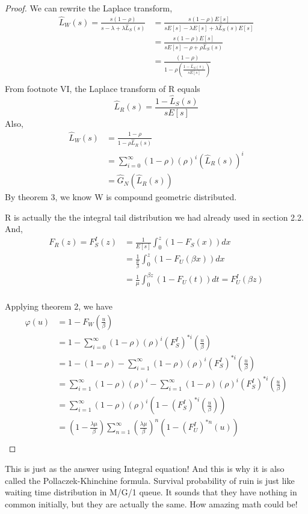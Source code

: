 \documentclass[project2.tex]{subfiles}
\begin{document}
\begin{proof}
We can rewrite the Laplace transform,
\begin{align*}
\hat{L}_W(s)=\frac{s(1-\rho)}{s-\lambda+\lambda\hat{L}_S(s)}&=\frac{s(1-\rho)E[s]}{sE[s]-\lambda E[s]+\lambda\hat{L}_S(s)E[s]}\\
&=\frac{s(1-\rho)E[s]}{sE[s]-\rho+\rho\hat{L}_S(s)}\\
&=\frac{(1-\rho)}{1-\rho(\frac{1-\hat{L}_S(s)}{sE[s]})}\\
\end{align*} 
From footnote VI, the Laplace transform of R equals $$\hat{L}_R(s)=\frac{1-\hat{L}_S(s)}{sE[s]}$$
Also,
\begin{align*}
\hat{L}_W(s)&=\frac{1-\rho}{1-\rho\hat{L}_R(s)}\\
&=\sum_{i=0}^{\infty}(1-\rho)(\rho)^i(\hat{L}_R(s))^i\\
&=\hat{G}_N(\hat{L}_R(s))
\end{align*} 
By theorem 3, we know W is compound geometric distributed.
\begin{remark}
R is actually the the integral tail distribution we had already used in section 2.2. And, 
\begin{align*}
F_R(z)=F_S^I(z)&=\frac{1}{E[s]}\int_0^z(1-F_S(x))dx\\
&=\frac{1}{\frac{\mu}{\beta}}\int_0^z(1-F_U(\beta x))dx\\
&=\frac{1}{\mu}\int_0^{\beta z}(1-F_U(t))dt=F_U^I(\beta z)\\
\end{align*}
\end{remark}
Applying theorem 2, we have
\begin{align*}
\varphi(u)&=1-F_W(\frac{u}{\beta})\\
&=1-\sum_{i=0}^\infty(1-\rho)(\rho)^i(F_S^I)^{*i}(\frac{u}{\beta})\\
&=1-(1-\rho)-\sum_{i=1}^\infty(1-\rho)(\rho)^i(F_S^I)^{*i}(\frac{u}{\beta})\\
&=\sum_{i=1}^\infty(1-\rho)(\rho)^i-\sum_{i=1}^\infty(1-\rho)(\rho)^i(F_S^I)^{*i}(\frac{u}{\beta})\\
&=\sum_{i=1}^\infty(1-\rho)(\rho)^i(1-(F_S^I)^{*i}(\frac{u}{\beta}))\\
&=(1-\frac{\lambda\mu}{\beta})\sum^{\infty}_{n=1}(\frac{\lambda\mu}{\beta})^n(1-(F_U^I)^{*n}(u))\\
\end{align*}
\end{proof}
This is just as the answer using Integral equation! And this is why it is also called the Pollaczek-Khinchine formula. Survival probability of ruin is just like waiting time distribution in M/G/1 queue. It sounds that they have nothing in common initially, but they are actually the same. How amazing math could be! 
\end{document}
